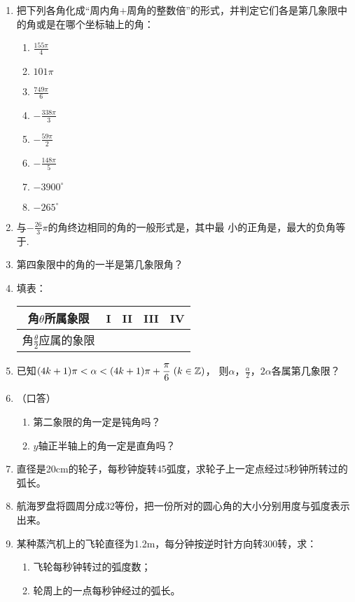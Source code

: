 \begin{enumerate}
    \item 把下列各角化成“周内角$+$周角的整数倍”的形式，并判定它们各是第几象限中的角或是在哪个坐标轴上的角：
\begin{multicols}{4}
\begin{enumerate}[(1)]
    \item $\frac{155\pi}{4}$
    \item $101\pi$
    \item $\frac{749\pi}{6}$
    \item $-\frac{338\pi}{3}$
    \item $-\frac{59\pi}{2}$
    \item $-\frac{148\pi}{5}$
    \item $-3900^{\circ}$
    \item $-265^{\circ}$
\end{enumerate}
\end{multicols}

\item 与$-\frac{26}{3}\pi$的角终边相同的角的一般形式是\blank，其中最
小的正角是\blank，最大的负角等于\blank.
\item 第四象限中的角的一半是第几象限角？

\item 填表：
\begin{center}
\begin{tabular}{c|c|c|c|c}
  \hline
    角$\theta$所属象限 &\; I\; & \; II\; &\; III&\; IV \\
    \hline
    角$\frac{\theta}{2}$应属的象限 &&&&\\
    \hline
\end{tabular}
\end{center}

\item 已知$(4k+1)\pi<\alpha<(4k+1)\pi+\dfrac{\pi}{6}\; (k\in\mathbb{Z})$，
则$\alpha$，$\frac{\alpha}{2}$，$2\alpha$各属第几象限？
\item （口答） \begin{enumerate}[(1)]
\item 第二象限的角一定是钝角吗？
\item $y$轴正半轴上的角一定是直角吗？
\end{enumerate}

\item 
直径是20cm的轮子，每秒钟旋转45弧度，求轮子上一定点经过5秒钟所转过的弧长。
\item 航海罗盘将圆周分成32等份，把一份所对的圆心角的大小分别用度与弧度表示出来。
\item 某种蒸汽机上的飞轮直径为1.2m，每分钟按逆时针方向转300转，求：
\begin{enumerate}[(1)]
\item 飞轮每秒钟转过的弧度数；
\item 轮周上的一点每秒钟经过的弧长。
\end{enumerate}



\end{enumerate}
